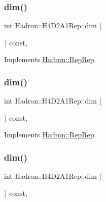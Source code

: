 \subsubsection{\texorpdfstring{dim()}{dim()}\hspace{0.1cm}{\footnotesize\ttfamily [3/5]}}
{\footnotesize\ttfamily int Hadron\+::\+H4\+D2\+A1\+Rep\+::dim (\begin{DoxyParamCaption}{ }\end{DoxyParamCaption}) const\hspace{0.3cm}{\ttfamily [inline]}, {\ttfamily [virtual]}}



Implements \mbox{\hyperlink{structHadron_1_1RepRep_a92c8802e5ed7afd7da43ccfd5b7cd92b}{Hadron\+::\+Rep\+Rep}}.

\mbox{\label{structHadron_1_1H4D2A1Rep_ae600fd0e83fd097e98797656ed4371e5}} 
\subsubsection{\texorpdfstring{dim()}{dim()}\hspace{0.1cm}{\footnotesize\ttfamily [4/5]}}
{\footnotesize\ttfamily int Hadron\+::\+H4\+D2\+A1\+Rep\+::dim (\begin{DoxyParamCaption}{ }\end{DoxyParamCaption}) const\hspace{0.3cm}{\ttfamily [inline]}, {\ttfamily [virtual]}}



Implements \mbox{\hyperlink{structHadron_1_1RepRep_a92c8802e5ed7afd7da43ccfd5b7cd92b}{Hadron\+::\+Rep\+Rep}}.

\mbox{\label{structHadron_1_1H4D2A1Rep_ae600fd0e83fd097e98797656ed4371e5}} 
\subsubsection{\texorpdfstring{dim()}{dim()}\hspace{0.1cm}{\footnotesize\ttfamily [5/5]}}
{\footnotesize\ttfamily int Hadron\+::\+H4\+D2\+A1\+Rep\+::dim (\begin{DoxyParamCaption}{ }\end{DoxyParamCaption}) const\hspace{0.3cm}{\ttfamily [inline]}, {\ttfamily [virtual]}}



